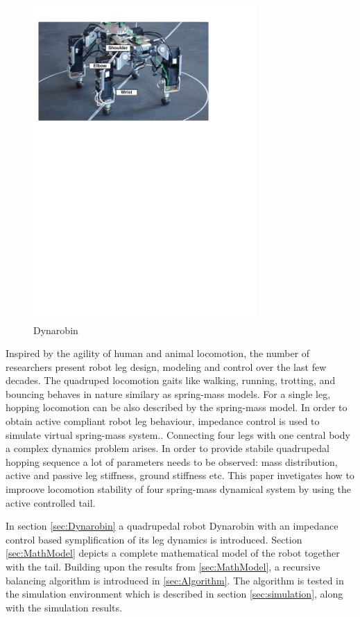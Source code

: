 \begin{figure}
	\centering
	\includegraphics[width=85mm]{./pictures/Dynarobin_introduction_image.pdf}
	\caption{Dynarobin}
	\label{fig:Dynarobin}
\end{figure}

Inspired by the agility of human and animal locomotion, the number of researchers present robot leg design, modeling and control over the last few decades\cite{CambridgeJournals:1345088}. The quadruped locomotion gaits like walking, running, trotting, and bouncing behaves in nature similary as spring-mass models\cite{Blickhan01}. For a single leg, hopping locomotion can be also described by the spring-mass model. In order to obtain active compliant robot leg behaviour, impedance control is used to simulate virtual spring-mass system.\cite{Havoutis01}. Connecting four legs with one central body a complex dynamics problem arises. In order to provide stabile quadrupedal hopping sequence a lot of parameters needs to be observed: mass distribution, active and passive leg stiffness, ground stiffness etc. This paper invetigates how to improove locomotion stability of four spring-mass dynamical system by using the active controlled tail.

In section \ref{sec:Dynarobin} a quadrupedal robot Dynarobin with an impedance control based symplification of its leg dynamics is introduced. Section \ref{sec:MathModel} depicts a complete mathematical model of the robot together with the tail. Building upon the results from \ref{sec:MathModel}, a recursive balancing algorithm is introduced in \ref{sec:Algorithm}. The algorithm is tested in the simulation environment which is described in section \ref{sec:simulation}, along with the simulation results. 





